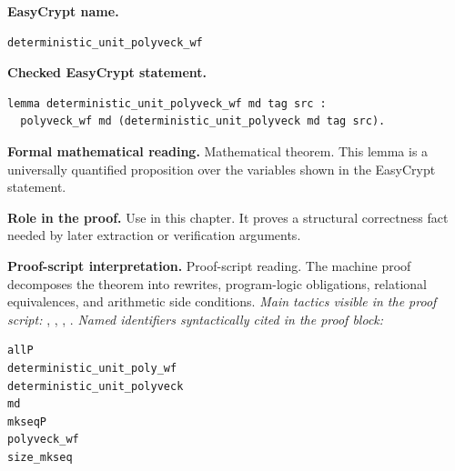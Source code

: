 \begin{formaltheorem}
\noindent\textbf{EasyCrypt name.}
\begin{lstlisting}[language=EasyCrypt,basicstyle=\ttfamily\scriptsize]
deterministic_unit_polyveck_wf
\end{lstlisting}
\noindent\textbf{Checked EasyCrypt statement.}
\begin{lstlisting}[language=EasyCrypt,basicstyle=\ttfamily\scriptsize]
lemma deterministic_unit_polyveck_wf md tag src :
  polyveck_wf md (deterministic_unit_polyveck md tag src).
\end{lstlisting}
\noindent\textbf{Formal mathematical reading.}
Mathematical theorem. This lemma is a universally quantified proposition over the variables shown in the EasyCrypt statement.

\noindent\textbf{Role in the proof.}
Use in this chapter. It proves a structural correctness fact needed by later extraction or verification arguments.

\noindent\textbf{Proof-script interpretation.}
Proof-script reading. The machine proof decomposes the theorem into rewrites, program-logic obligations, relational equivalences, and arithmetic side conditions.
\emph{Main tactics visible in the proof script:} , , , .
\emph{Named identifiers syntactically cited in the proof block:}
\begin{lstlisting}[language=EasyCrypt,basicstyle=\ttfamily\scriptsize]
allP
deterministic_unit_poly_wf
deterministic_unit_polyveck
md
mkseqP
polyveck_wf
size_mkseq
\end{lstlisting}

\end{formaltheorem}

